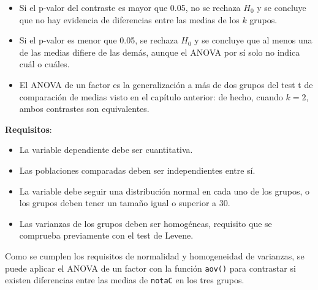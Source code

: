 \documentclass[
  spanish,
  a4paper,
]{scrreport}
\providecommand{\tightlist}{%
  \setlength{\itemsep}{0pt}\setlength{\parskip}{0pt}}
\theoremstyle{definition}
\theoremstyle{definition}
\theoremstyle{remark}
\begin{document}
\begin{tcolorbox}[enhanced jigsaw, arc=.35mm, bottomrule=.15mm, bottomtitle=1mm, breakable, colback=white, colbacktitle=quarto-callout-note-color!10!white, colframe=quarto-callout-note-color-frame, coltitle=black, left=2mm, leftrule=.75mm, opacityback=0, opacitybacktitle=0.6, rightrule=.15mm, title=\textcolor{quarto-callout-note-color}{\faInfo}\hspace{0.5em}{Interpretación}, titlerule=0mm, toprule=.15mm, toptitle=1mm]

\begin{itemize}
\tightlist
\item
  Si el p-valor del contraste es mayor que 0.05, no se rechaza \(H_0\) y
  se concluye que no hay evidencia de diferencias entre las medias de
  los \(k\) grupos.
\item
  Si el p-valor es menor que 0.05, se rechaza \(H_0\) y se concluye que
  al menos una de las medias difiere de las demás, aunque el ANOVA por
  sí solo no indica cuál o cuáles.
\item
  El ANOVA de un factor es la generalización a más de dos grupos del
  test t de comparación de medias visto en el capítulo anterior: de
  hecho, cuando \(k=2\), ambos contrastes son equivalentes.
\end{itemize}

\end{tcolorbox}

\textbf{Requisitos}:

\begin{itemize}
\tightlist
\item
  La variable dependiente debe ser cuantitativa.
\item
  Las poblaciones comparadas deben ser independientes entre sí.
\item
  La variable debe seguir una distribución normal en cada uno de los
  grupos, o los grupos deben tener un tamaño igual o superior a 30.
\item
  Las varianzas de los grupos deben ser homogéneas, requisito que se
  comprueba previamente con el test de Levene.
\end{itemize}

Como se cumplen los requisitos de normalidad y homogeneidad de
varianzas, se puede aplicar el ANOVA de un factor con la función
\texttt{aov()} para contrastar si existen diferencias entre las medias
de \texttt{notaC} en los tres grupos.
\end{document}

